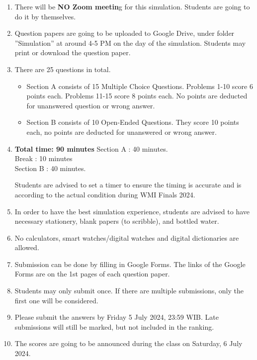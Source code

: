 \documentclass[12pt]{scrartcl}
\begin{document}
\begin{enumerate}[leftmargin=*]
    \item There will be \textbf{NO Zoom meetin}g for this simulation. Students are going to do it by themselves.
    
    \item Question papers are going to be uploaded to Google Drive, under folder ''Simulation'' at around 4-5 PM on the day of the simulation. Students may print or download the question paper.
    
    \item There are 25 questions in total.
    \begin{itemize}
        \item Section A consists of 15 Multiple Choice Questions. Problems 1-10 score 6 points each. Problems 11-15 score 8 points each. No points are deducted for unanswered question or wrong answer.
        \item Section B consists of 10 Open-Ended Questions. They score 10 points each, no points are deducted for unanswered or wrong answer.
    \end{itemize}

    \item \textbf{Total time: 90 minutes} 
    \newline
    Section A : 40 minutes.\\
    Break : 10 minutes \\
    Section B : 40 minutes.
    
    Students are advised to set a timer to ensure the timing is accurate and is according to the actual condition during WMI Finals 2024.
    
    \item In order to have the best simulation experience, students are advised to have necessary stationery, blank papers (to scribble), and bottled water.
    
    \item No calculators, smart watches/digital watches and digital dictionaries are allowed.
    
    \item Submission can be done by filling in Google Forms. The links of the Google Forms are on the 1st pages of each question paper.
    
    \item Students may only submit once. If there are multiple submissions, only the first one will be considered.
    
    \item Please submit the answers by Friday 5 July 2024, 23:59 WIB. Late submissions will still be marked, but not included in the ranking.
    
    \item The scores are going to be announced during the class on Saturday, 6 July 2024.
\end{enumerate}
\end{document}
